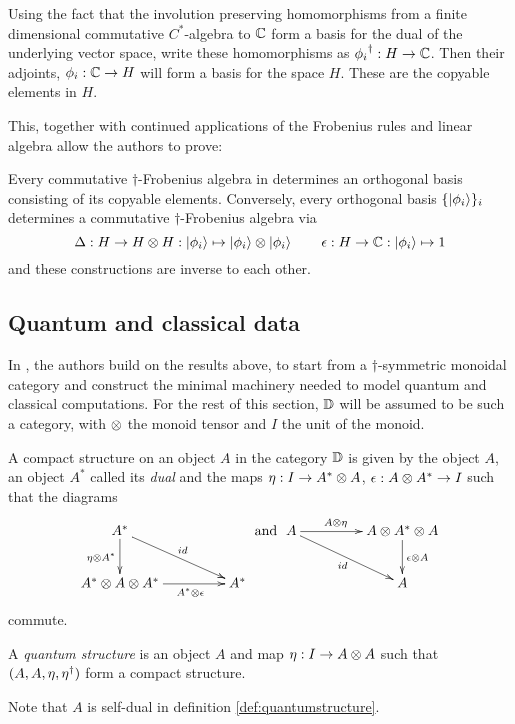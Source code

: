 Using the fact that the involution preserving homomorphisms from a finite dimensional commutative
$C^{*}$-algebra to $\mathbb{C}$ form a basis for the dual of the underlying vector space, write these
homomorphisms as ${\phi_{i}}^{\dagger}:H \to \mathbb{C}$. Then their adjoints, $\phi_{i}:\mathbb{C}\to H$ will form a
basis for the space $H$. These are the copyable elements in $H$.

This, together with continued applications of the Frobenius rules and linear algebra allow the
authors to prove:
\begin{theorem}
  Every commutative $\dagger$-Frobenius algebra in \fdh determines an orthogonal basis consisting
  of its copyable elements. Conversely, every orthogonal basis $\{\left\vert{\phi_{i}}\right\rangle\}_{i}$ determines
  a commutative $\dagger$-Frobenius algebra via \[\Delta:H\to H\otimes H: \left\vert{\phi_{i}}\right\rangle\mapsto
  \left\vert{\phi_{i}}\right\rangle \otimes \left\vert{\phi_{i}}\right\rangle\qquad\epsilon : H\to \mathbb{C} : \left\vert{\phi_{i}}\right\rangle \mapsto 1\] and these
  constructions are inverse to each other.
\end{theorem}

\subsection{Quantum and classical data}\label{sec:quantumclassical}
In \cite{coecke08structures}, the authors build on the results above,
to start from a $\dagger$-symmetric monoidal category and construct the minimal machinery needed to
model quantum and classical computations. For the rest of this section, $\mathbb{D}$ will be assumed to be
such a category, with $\otimes$ the monoid tensor and $I$ the unit of the monoid.

\begin{definition}
  A compact structure on an object $A$ in the category $\mathbb{D}$ is given by the object $A$, an object
  $A^{*}$ called its \emph{dual} and the maps $\eta:I \to A^{*}\otimes A$, $\epsilon: A\otimes A^{*} \to I$
  such that the diagrams
  \[
    \xymatrix@C+20pt{
      A^{*} \ar[dr]^{id} \ar[d]_{\eta\*A^{*}} \\
      A^{*} \*A\*A^{*}  \ar[r]_(.6){A^{*} \*\epsilon} & A^{*}
    }
    \text{ and }
    \xymatrix@C+20pt{
      A \ar[r]^(.4){A\*\eta} \ar[dr]_{id} & A\* A^{*}\* A \ar[d]^{\epsilon\*A}\\
      & A
    }
  \]
  commute.
\end{definition}

\begin{definition}\label{def:quantumstructure}
  A \emph{quantum structure} is an object $A$ and map $\eta:I\to A\otimes A$ such that
  $(A,A,\eta,{\eta}^{\dagger})$ form a compact structure.
\end{definition}
Note that $A$ is self-dual in definition \ref{def:quantumstructure}.

